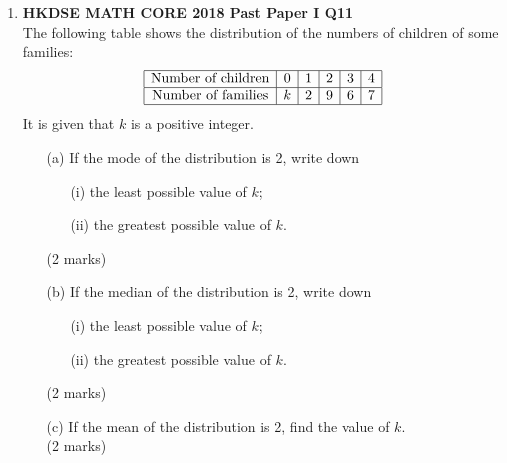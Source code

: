 \documentclass[12pt]{article}
\begin{document}
\begin{enumerate}
	\item \textbf{HKDSE MATH CORE 2018 Past Paper I Q11}\\
	The following table shows the distribution of the numbers of children of some families:
	$$\begin{array}{|c|c|c|c|c|c|}
		\hline
		\text{Number of children} & 0 & 1 & 2 & 3 & 4 \\
		\hline
		\text{Number of families} & k & 2 & 9 & 6 & 7 \\
		\hline
	\end{array}$$
	It is given that $k$ is a positive integer.
	\begin{enumerate}
		\item[(a)] If the mode of the distribution is 2, write down
		\begin{enumerate}
			\item[(i)] the least possible value of $k$;
			\item[(ii)] the greatest possible value of $k$.
		\end{enumerate}
		(2 marks)
		\item[(b)] If the median of the distribution is 2, write down
		\begin{enumerate}
			\item[(i)] the least possible value of $k$;
			\item[(ii)] the greatest possible value of $k$.
		\end{enumerate}
		(2 marks)
		\item[(c)] If the mean of the distribution is 2, find the value of $k$. \\(2 marks)
	\end{enumerate}



\end{enumerate}
\end{document}
